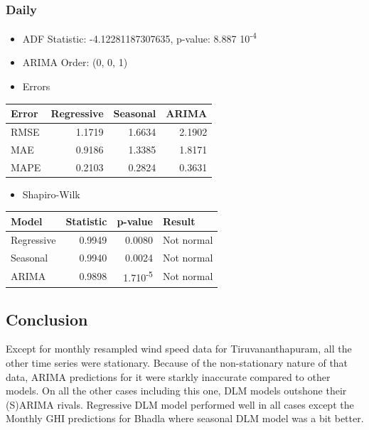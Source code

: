 \documentclass[a4paper,12pt]{article}
\begin{document}
\subsubsection{Daily}
\label{sec:org6a059fe}
\begin{itemize}
\item ADF Statistic: -4.12281187307635,  p-value: 8.887 \texttimes{} 10\textsuperscript{-4}
\item ARIMA Order: (0, 0, 1)
\item Errors
\end{itemize}
\begin{center}
\begin{tabular}{lrrr}
Error & \textbf{Regressive} & Seasonal & ARIMA\\[0pt]
\hline
RMSE & 1.1719 & 1.6634 & 2.1902\\[0pt]
MAE & 0.9186 & 1.3385 & 1.8171\\[0pt]
MAPE & 0.2103 & 0.2824 & 0.3631\\[0pt]
\end{tabular}
\end{center}
\begin{itemize}
\item Shapiro-Wilk
\end{itemize}
\begin{center}
\begin{tabular}{lrrl}
Model & Statistic & p-value & Result\\[0pt]
\hline
Regressive & 0.9949 & 0.0080 & Not normal\\[0pt]
Seasonal & 0.9940 & 0.0024 & Not normal\\[0pt]
ARIMA & 0.9898 & 1.7\texttimes{}10\textsuperscript{-5} & Not normal\\[0pt]
\end{tabular}
\end{center}
\subsection{Conclusion}
\label{sec:org728f62a}
Except for monthly resampled wind speed data for Tiruvananthapuram, all the other time series were stationary. Because of the non-stationary nature of that data, ARIMA predictions for it were starkly inaccurate compared to other models. On all the other cases including this one, DLM models outshone their (S)ARIMA rivals. Regressive DLM model performed well in all cases except the Monthly GHI predictions for Bhadla where seasonal DLM model was a bit better.
\end{document}
